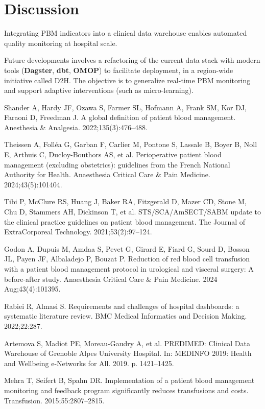\documentclass{IOS-Book-Article}
\begin{document}
\section{Discussion}

Integrating PBM indicators into a clinical data warehouse enables automated quality monitoring at 
hospital scale. 

Future developments involves a refactoring of the current data stack with modern tools (\textbf{Dagster}, 
\textbf{dbt}, \textbf{OMOP}) to facilitate deployment, in a region-wide initiative called D2H. The objective
is to generalize real-time PBM monitoring and support adaptive interventions (such as micro-learning).

\begin{thebibliography}{99}

Shander A, Hardy JF, Ozawa S, Farmer SL, Hofmann A, Frank SM, Kor DJ, Faraoni D, Freedman J. A global definition of patient blood management. Anesthesia \& Analgesia. 2022;135(3):476--488.

Theissen A, Folléa G, Garban F, Carlier M, Pontone S, Lassale B, Boyer B, Noll E, Arthuis C, Ducloy-Bouthors AS, et al. Perioperative patient blood management (excluding obstetrics): guidelines from the French National Authority for Health. Anaesthesia Critical Care \& Pain Medicine. 2024;43(5):101404.

Tibi P, McClure RS, Huang J, Baker RA, Fitzgerald D, Mazer CD, Stone M, Chu D, Stammers AH, Dickinson T, et al. STS/SCA/AmSECT/SABM update to the clinical practice guidelines on patient blood management. The Journal of ExtraCorporeal Technology. 2021;53(2):97--124.

Godon A, Dupuis M, Amdaa S, Pevet G, Girard E, Fiard G, Sourd D, Bosson JL, Payen JF, Albaladejo P, Bouzat P. Reduction of red blood cell transfusion with a patient blood management protocol in urological and visceral surgery: A before-after study. Anaesthesia Critical Care \& Pain Medicine. 2024 Aug;43(4):101395.

Rabiei R, Almasi S. Requirements and challenges of hospital dashboards: a systematic literature review. BMC Medical Informatics and Decision Making. 2022;22:287.

Artemova S, Madiot PE, Moreau-Gaudry A, et al. PREDIMED: Clinical Data Warehouse of Grenoble Alpes University Hospital. In: MEDINFO 2019: Health and Wellbeing e-Networks for All. 2019. p. 1421--1425.

Mehra T, Seifert B, Spahn DR. Implementation of a patient blood management monitoring and feedback program significantly reduces transfusions and costs. Transfusion. 2015;55:2807--2815.

\end{thebibliography}
\end{document}
